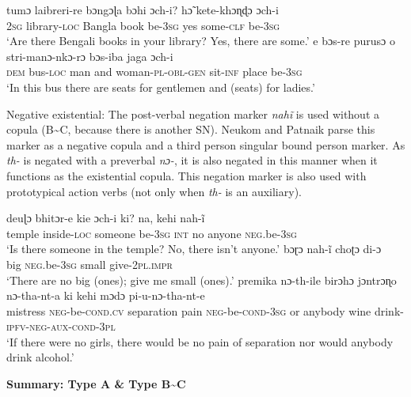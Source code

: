 ﻿\documentclass[output=paper]{langsci/langscibook}
\begin{document}
\begin{unindented}
\begin{exe}
\ex \gll tumɔ laibreri-re bɔngɔɭa bɔhi  ɔch-i? hɔ̃ kete-khɔɳɖɔ ɔch-i \\
\textsc{2sg} library-\textsc{loc} Bangla book be-\textsc{3sg} yes some-\textsc{clf} be-\textsc{3sg} \\
    \glt `Are there Bengali books in your library? Yes, there are some.'
\parencite[118]{NeukomPatnaik2003}
\ex \gll e bɔs-re purusɔ o stri-manɔ-nkɔ-rɔ bɔs-iba jaga  ɔch-i \\
\textsc{dem} bus-\textsc{loc} man and woman-\textsc{pl-obl-gen} sit-\textsc{inf} place be-\textsc{3sg} \\
\glt `In this bus there are seats for gentlemen and (seats) for ladies.'
\parencite[38]{NeukomPatnaik2003}
    \end{exe}

Negative existential: The post-verbal negation marker \textit{nahĩ} is used without a copula (B{\textasciitilde}C, because there is another SN). Neukom and Patnaik parse this marker as a negative copula and a third person singular bound person marker. As \textit{th-} is negated with a preverbal \textit{nɔ-}, it is also negated in this manner when it functions as the existential copula. This negation marker is also used with prototypical action verbs (not only when \textit{th-} is an auxiliary). 
%
\begin{exe}\ex \gll deuɭɔ bhitɔr-e kie ɔch-i ki? na, kehi nah-ĩ \\
temple inside-\textsc{loc}   someone be-\textsc{3sg}   \textsc{int}      no  anyone \textsc{neg}.be-\textsc{3sg} \\
    \glt `Is there someone in the temple? No, there isn't anyone.'
\parencite[100]{NeukomPatnaik2003}
\ex \gll bɔɽɔ nah-ĩ choʈɔ di-ɔ \\
big \textsc{neg}.be-\textsc{3sg} small give-\textsc{2pl.impr} \\
    \glt `There are no big (ones); give me small (ones).' \parencite[72]{NeukomPatnaik2003} 
\ex \gll premika nɔ-th-ile birɔhɔ jɔntrɔɳo nɔ-tha-nt-a ki kehi mɔdɔ pi-u-nɔ-tha-nt-e \\
mistress \textsc{neg}-be-\textsc{cond}.\textsc{cv}   separation pain        \textsc{neg}-be-\textsc{cond}-\textsc{3sg} or anybody wine drink-\textsc{ipfv-neg-aux-cond-3pl} \\
    \glt `If there were no girls, there would be no pain of separation nor would anybody drink alcohol.' \parencite[195]{NeukomPatnaik2003}
\end{exe}

\textbf{Summary: Type A \& Type B{\textasciitilde}C} 


\end{unindented}
\end{document}
